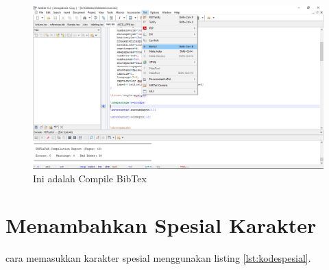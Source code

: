 \begin{enumerate}
   \begin{figure}[!htbp]
  \centering
  \includegraphics[width=.75\textwidth]{figures/bibtexx.png}
  \caption{Ini adalah Compile BibTex}\label{fig:bibtexx}
\end{figure}
\end{enumerate}

\section{Menambahkan Spesial Karakter}
cara memasukkan karakter spesial menggunakan listing \ref{lst:kodespesial}.



